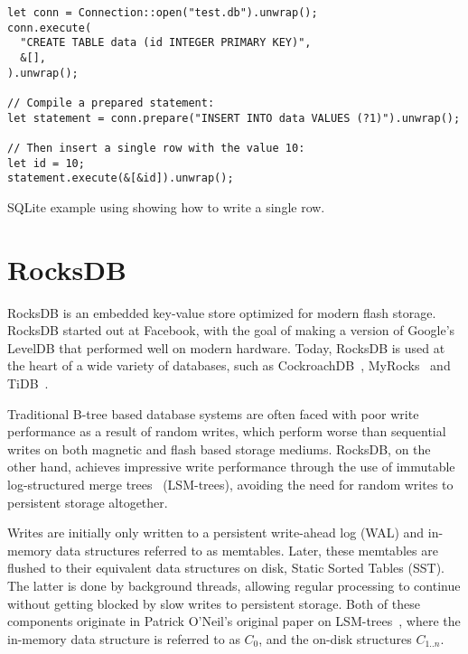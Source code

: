 \begin{listing}[H]
  \begin{verbatim}
let conn = Connection::open("test.db").unwrap();
conn.execute(
  "CREATE TABLE data (id INTEGER PRIMARY KEY)",
  &[],
).unwrap();

// Compile a prepared statement:
let statement = conn.prepare("INSERT INTO data VALUES (?1)").unwrap();

// Then insert a single row with the value 10:
let id = 10;
statement.execute(&[&id]).unwrap();

  \end{verbatim}

  \caption{SQLite example using  showing how to write a single
  row.}\label{lst:sqlite-rust}
\end{listing}

\section{RocksDB}\label{sec:rocksdb}
RocksDB is an embedded key-value store optimized for modern flash storage.
RocksDB started out at Facebook, with the goal of making a version of Google's
LevelDB that performed well on modern hardware. Today, RocksDB is used at the
heart of a wide variety of databases, such as CockroachDB~\cite{cockroach},
MyRocks~\cite{myrocks} and TiDB~\cite{tidb}.

Traditional B-tree based database systems are often faced with poor write
performance as a result of random writes, which perform worse than sequential
writes on both magnetic and flash based storage mediums. RocksDB, on the other
hand, achieves impressive write performance through the use of immutable
log-structured merge trees~\cite{lsm} (LSM-trees), avoiding the need for random
writes to persistent storage altogether.

Writes are initially only written to a persistent write-ahead log (WAL) and
in-memory data structures referred to as memtables. Later, these memtables are
flushed to their equivalent data structures on disk, Static Sorted Tables (SST).
The latter is done by background threads, allowing regular processing to
continue without getting blocked by slow writes to persistent storage. Both of
these components originate in Patrick O'Neil's original paper on
LSM-trees~\cite{lsm}, where the in-memory data structure is referred to as $ C_0
$, and the on-disk structures $ C_{1..n} $.


